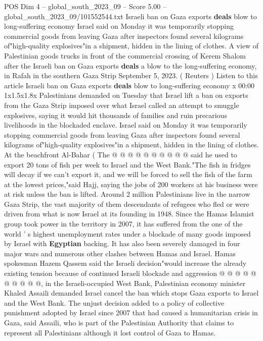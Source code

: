 \begin{textsample}{POS Dim 4 – global\_south\_2023\_09 – Score 5.00 – global\_south\_2023\_09/101552544.txt}  \label{ex:f4_pos_432}
Israeli ban on Gaza exports \textbf{deals} blow to long-suffering economy Israel said on Monday it was temporarily stopping commercial goods from leaving Gaza after inspectors found several kilograms of"high-quality explosives"in a shipment, hidden in the lining of clothes.
A view of Palestinian goods trucks in front of the commercial crossing of Kerem Shalom after the Israeli ban on Gaza exports \textbf{deals} a blow to the long-suffering economy, in Rafah in the southern Gaza Strip September 5, 2023. ( Reuters ) Listen to this article Israeli ban on Gaza exports \textbf{deals} blow to long-suffering economy x 00:00 1x1.5x1.8x Palestinians demanded on Tuesday that Israel lift a ban on exports from the Gaza Strip imposed over what Israel called an attempt to smuggle explosives, saying it would hit thousands of families and ruin precarious livelihoods in the blockaded enclave.
Israel said on Monday it was temporarily stopping commercial goods from leaving Gaza after inspectors found several kilograms of"high-quality explosives"in a shipment, hidden in the lining of clothes.
At the beachfront Al-Bahar ( The @ @ @ @ @ @ @ @ @ @ said he used to export 20 tons of fish per week to Israel and the West Bank."The fish in fridges will decay if we can't export it, and we will be forced to sell the fish of the farm at the lowest prices,"said Hajj, saying the jobs of 200 workers at his business were at risk unless the ban is lifted.
Around 2 million Palestinians live in the narrow Gaza Strip, the vast majority of them descendants of refugees who fled or were driven from what is now Israel at its founding in 1948.
Since the Hamas Islamist group took power in the territory in 2007, it has suffered from the one of the world ' s highest unemployment rates under a blockade of many goods imposed by Israel with \textbf{Egyptian} backing.
It has also been severely damaged in four major wars and numerous other clashes between Hamas and Israel.
Hamas spokesman Hazem Qassem said the Israeli decision"would increase the already existing tension because of continued Israeli blockade and aggression @ @ @ @ @ @ @ @ @ @, in the Israeli-occupied West Bank, Palestinian economy minister Khaled Assaili demanded Israel cancel the ban which stops Gaza exports to Israel and the West Bank.
The unjust decision added to a policy of collective punishment adopted by Israel since 2007 that had caused a humanitarian crisis in Gaza, said Assaili, who is part of the Palestinian Authority that claims to represent all Palestinians although it lost control of Gaza to Hamas.

\end{textsample}
